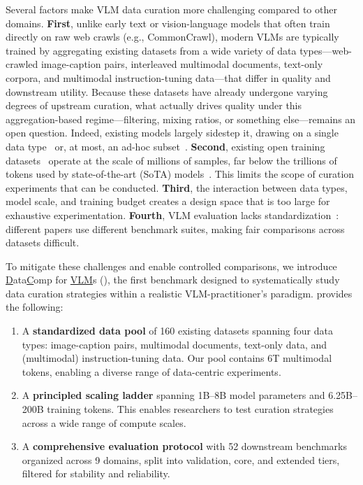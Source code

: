 \fighero
Several factors make VLM data curation more challenging compared to other domains.
\textbf{First}, unlike early text or vision-language models that often train directly on raw web crawls (e.g., CommonCrawl), modern VLMs are typically trained by aggregating existing datasets from a wide variety of data types---web-crawled image-caption pairs, interleaved multimodal documents, text-only corpora, and multimodal instruction-tuning data---that differ in quality and downstream utility. 
Because these datasets have already undergone varying degrees of upstream curation, what actually drives quality under this aggregation-based regime---filtering, mixing ratios, or something else---remains an open question. Indeed, existing models largely sidestep it, drawing on a single data type~\citep{liu2023visual} or, at most, an ad-hoc subset~\citep{alayrac2022flamingo,bai2025qwen25vltechnicalreport}.
\textbf{Second}, existing open training datasets~\citep{wiedmann2025finevision,an2025llava,deshmukh2025nvidia,zhao2023svit,deitke2025molmo,tong2024cambrian} operate at the scale of millions of samples, far below the trillions of tokens used by state-of-the-art (SoTA) models~\citep{team2025kimi,wang2025internvl3,bai2025qwen3,coreteam2025mimovltechnicalreport}. This limits the scope of curation experiments that can be conducted. 
\textbf{Third}, the interaction between data types, model scale, and 
training budget creates a 
design space that is too large for exhaustive experimentation.
\textbf{Fourth}, VLM evaluation lacks standardization~\citep{joshi2026datbench}: different papers use different benchmark suites, making fair comparisons across datasets difficult.

To mitigate these challenges and enable controlled comparisons, we introduce \underline{D}ata\underline{C}omp for \underline{VLM}s (\dcvlm), the first benchmark designed to systematically study data curation strategies within a realistic VLM-practitioner's paradigm.
\dcvlm provides the following:
\begin{enumerate}[leftmargin=*, itemsep=0pt, topsep=0pt, parsep=0pt, partopsep=0pt]
    \item A \textbf{standardized data pool} of 160 existing datasets spanning four data types: image-caption pairs, multimodal documents, text-only data, and (multimodal) instruction-tuning data. 
    Our pool contains 6T multimodal tokens, enabling a diverse range of data-centric experiments.
    \item A \textbf{principled scaling ladder} spanning 1B--8B model parameters and 6.25B--200B training tokens. This enables researchers to test curation strategies across a wide range of compute scales.
    \item A \textbf{comprehensive evaluation protocol} with 52 downstream benchmarks organized across 9 domains, split into validation, core, and extended tiers, filtered for stability and reliability. 
\end{enumerate}
 
